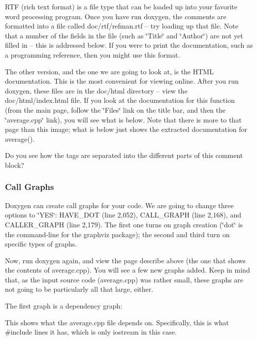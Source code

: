 R\+TF (rich text format) is a file type that can be loaded up into your favorite word processing program. Once you have run doxygen, the comments are formatted into a file called {\ttfamily doc/rtf/refman.\+rtf} -- try loading up that file. Note that a number of the fields in the file (such as \char`\"{}\+Title\char`\"{} and \char`\"{}\+Author\char`\"{}) are not yet filled in -- this is addressed below. If you were to print the documentation, such as a programming reference, then you might use this format.

The other version, and the one we are going to look at, is the H\+T\+ML documentation. This is the most convenient for viewing online. After you run doxygen, these files are in the {\ttfamily doc/html} directory -- view the {\ttfamily doc/html/index.\+html} file. If you look at the documentation for this function (from the main page, follow the \char`\"{}\+Files\char`\"{} link on the title bar, and then the \char`\"{}average.\+cpp\char`\"{} link), you will see what is below. Note that there is more to that page than this image; what is below just shows the extracted documentation for {\ttfamily average()}.



Do you see how the tags are separated into the different parts of this comment block?

\subsubsection*{Call Graphs}

Doxygen can create call graphs for your code. We are going to change three options to \char`\"{}\+Y\+E\+S\char`\"{}\+: {\ttfamily H\+A\+V\+E\+\_\+\+D\+OT} (line 2,052), {\ttfamily C\+A\+L\+L\+\_\+\+G\+R\+A\+PH} (line 2,168), and {\ttfamily C\+A\+L\+L\+E\+R\+\_\+\+G\+R\+A\+PH} (line 2,179). The first one turns on graph creation (\char`\"{}dot\char`\"{} is the command-\/line for the graphviz package); the second and third turn on specific types of graphs.

Now, run {\ttfamily doxygen} again, and view the page describe above (the one that shows the contents of average.\+cpp). You will see a few new graphs added. Keep in mind that, as the input source code (average.\+cpp) was rather small, these graphs are not going to be particularly all that large, either.

The first graph is a dependency graph\+:



This shows what the average.\+cpp file depends on. Specifically, this is what {\ttfamily \#include} lines it has, which is only iostream in this case.

